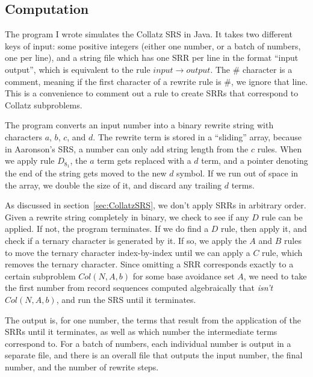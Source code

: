 \documentclass[12pt]{article}
\theoremstyle{definition}
\begin{document}
\subsection{Computation} \label{subsec:rewritecomp}
The program I wrote simulates the Collatz SRS in Java. It takes two different keys of input: some positive integers (either one number, or a batch of numbers, one per line), and a string file which has one SRR per line in the format ``input output'', which is equivalent to the rule $input \rightarrow output$. The \# character is a comment, meaning if the first character of a rewrite rule is \#, we ignore that line. This is a convenience to comment out a rule to create SRRs that correspond to Collatz subproblems. \par
The program converts an input number into a binary rewrite string with characters $a$, $b$, $c$, and $d$. The rewrite term is stored in a ``sliding'' array, because in Aaronson's SRS, a number can only add string length from the $c$ rules. When we apply rule $D_{8_1}$, the $a$ term gets replaced with a $d$ term, and a pointer denoting the end of the string gets moved to the new $d$ symbol. If we run out of space in the array, we double the size of it, and discard any trailing $d$ terms. \par
As discussed in section~\ref{sec:CollatzSRS}, we don't apply SRRs in arbitrary order. Given a rewrite string completely in binary, we check to see if any $D$ rule can be applied. If not, the program terminates. If we do find a $D$ rule, then apply it, and check if a ternary character is generated by it. If so, we apply the $A$ and $B$ rules to move the ternary character index-by-index until we can apply a $C$ rule, which removes the ternary character.
Since omitting a SRR corresponds exactly to a certain subproblem $Col(N,A,b)$ for some base avoidance set $A$, we need to take the first number from record sequences computed algebraically that \textit{isn't} $Col(N,A,b)$, and run the SRS until it terminates. \par
The output is, for one number, the terms that result from the application of the SRRs until it terminates, as well as which number the intermediate terms correspond to. For a batch of numbers, each individual number is output in a separate file, and there is an overall file that outputs the input number, the final number, and the number of rewrite steps.
\end{document}

